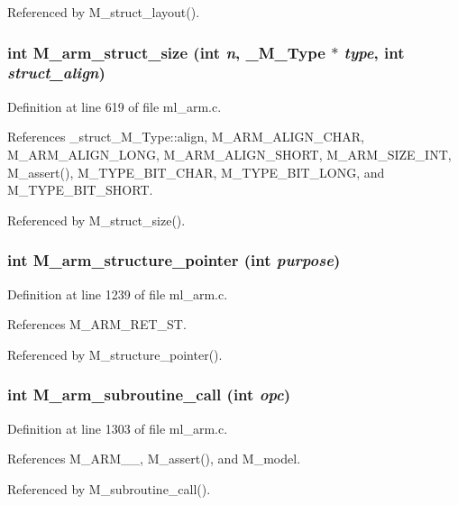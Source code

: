 Referenced by M\_\-struct\_\-layout().
\subsubsection{\setlength{\rightskip}{0pt plus 5cm}int M\_\-arm\_\-struct\_\-size (int {\em n}, \bf{\_\-M\_\-Type} $\ast$ {\em type}, int {\em struct\_\-align})}\label{m__arm_8h_67a83835eaa776865b9cc6f8d6a7e50d}




Definition at line 619 of file ml\_\-arm.c.

References \_\-struct\_\-M\_\-Type::align, M\_\-ARM\_\-ALIGN\_\-CHAR, M\_\-ARM\_\-ALIGN\_\-LONG, M\_\-ARM\_\-ALIGN\_\-SHORT, M\_\-ARM\_\-SIZE\_\-INT, M\_\-assert(), M\_\-TYPE\_\-BIT\_\-CHAR, M\_\-TYPE\_\-BIT\_\-LONG, and M\_\-TYPE\_\-BIT\_\-SHORT.

Referenced by M\_\-struct\_\-size().
\subsubsection{\setlength{\rightskip}{0pt plus 5cm}int M\_\-arm\_\-structure\_\-pointer (int {\em purpose})}\label{m__arm_8h_ac9b817a16a69fab6d0708dd058e7dbb}




Definition at line 1239 of file ml\_\-arm.c.

References M\_\-ARM\_\-RET\_\-ST.

Referenced by M\_\-structure\_\-pointer().
\subsubsection{\setlength{\rightskip}{0pt plus 5cm}int M\_\-arm\_\-subroutine\_\-call (int {\em opc})}\label{m__arm_8h_92afdb8ce1293bd6e10f69c5aa219a75}




Definition at line 1303 of file ml\_\-arm.c.

References M\_\-ARM\_\_, M\_\-assert(), and M\_\-model.

Referenced by M\_\-subroutine\_\-call().
